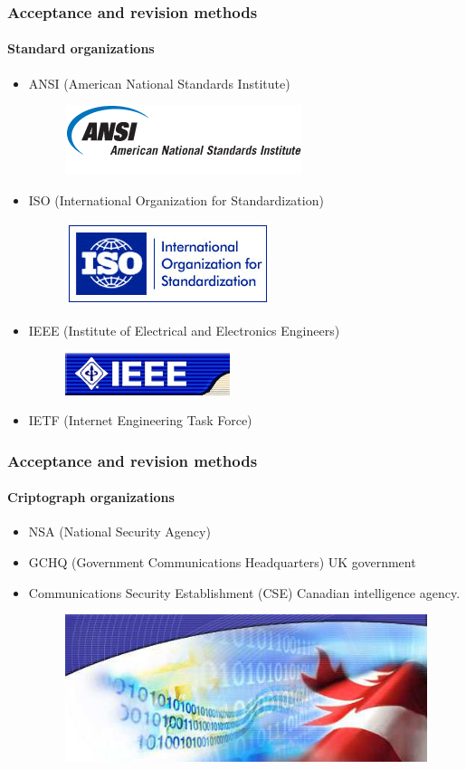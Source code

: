 \documentclass{beamer}
\begin{document}
\begin{frame}
\frametitle{Acceptance and revision methods}
\framesubtitle{Standard organizations}
\begin{itemize}
\item ANSI (American National Standards Institute)
\begin{figure}
\includegraphics[width=0.3\linewidth]{ansi.png}
\end{figure}
\item ISO (International Organization for Standardization)
\begin{figure}
\includegraphics[width=0.3\linewidth]{iso.png}
\end{figure}
\item IEEE (Institute of Electrical and Electronics Engineers)
\begin{figure}
\includegraphics[width=0.3\linewidth]{ieee.png}
\end{figure}
\item IETF (Internet Engineering Task Force)
\end{itemize}
\end{frame}

\begin{frame}
\frametitle{Acceptance and revision methods}
\framesubtitle{Criptograph organizations}
\begin{itemize}
\item NSA (National Security Agency)
\item GCHQ (Government Communications Headquarters) UK government
\item Communications Security Establishment (CSE) Canadian intelligence agency.
\begin{figure}
\includegraphics[width=0.3\linewidth]{cse.png}
\end{figure}
\end{itemize}
\end{frame}
\end{document}
